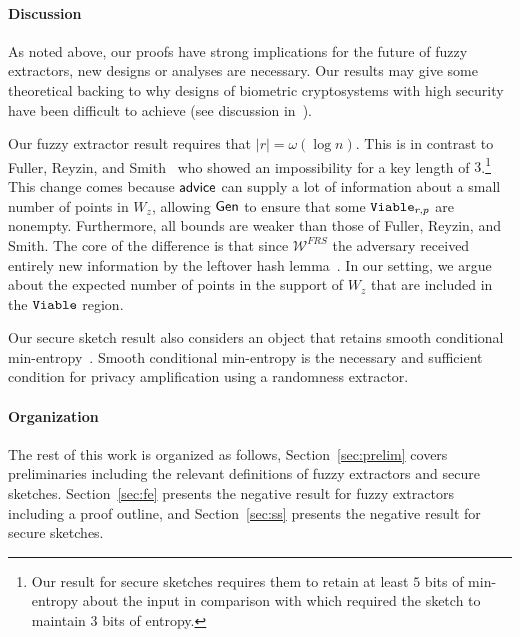 \paragraph{Discussion}
As noted above, our proofs  have strong implications for the future of fuzzy extractors, new designs or analyses are necessary.  Our results may give some theoretical backing to why designs of biometric cryptosystems with high security have been difficult to achieve (see discussion in~\cite{simhadri2019cryptographic}).

Our fuzzy extractor result requires that $|r| = \omega(\log n)$.  This is in contrast to Fuller, Reyzin, and Smith~\cite{fuller2020fuzzy} who showed an impossibility for a key length of $3$.\footnote{Our result for secure sketches requires them to retain at least $5$ bits of min-entropy about the input in comparison with \cite{fuller2020computational} which required the sketch to maintain $3$ bits of entropy.} This change comes because ${\mathsf{advice}}$ can supply a lot of information about a small number of points in $W_z$, allowing ${\mathsf{Gen}}$ to ensure that some $\mathtt{Viable}_{r,p}$ are nonempty. Furthermore, all bounds are weaker than those of Fuller, Reyzin, and Smith.  The core of the difference is that since $\mathcal{W}^{FRS}$ the adversary received entirely new information by the leftover hash lemma~\cite{haastad1993construction,barak2011leftover}. In our setting, we argue about the expected number of points in the support of $W_z$ that are included in the $\mathtt{Viable}$ region. 

Our secure sketch result also considers an object that retains smooth conditional min-entropy~\cite{renner2005simple}.  %
Smooth conditional min-entropy is the necessary and sufficient condition for privacy amplification using a randomness extractor. 


\paragraph{Organization} The rest of this work is organized as follows, Section~\ref{sec:prelim} covers preliminaries including the relevant definitions of fuzzy extractors and secure sketches.  Section~\ref{sec:fe} presents the negative result for fuzzy extractors including a proof outline, and Section~\ref{sec:ss} presents the negative result for secure sketches.


